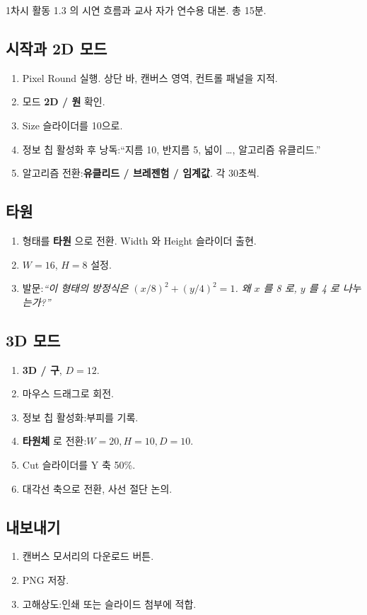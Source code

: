 \documentclass[12pt,a4paper]{scrartcl}
\newcommand{\acc}[1]{\textcolor{accent}{\textbf{#1}}}
\begin{document}
1차시 활동 1.3 의 시연 흐름과 교사 자가 연수용 대본. 총 15분.

\subsection{시작과 2D 모드}
\begin{enumerate}[leftmargin=1.5em,itemsep=0.15em,topsep=0.3em]
  \item Pixel Round 실행. 상단 바, 캔버스 영역, 컨트롤 패널을 지적.
  \item 모드 \acc{2D / 원} 확인.
  \item Size 슬라이더를 10으로.
  \item 정보 칩 활성화 후 낭독:``지름 10, 반지름 5, 넓이 …, 알고리즘 유클리드.''
  \item 알고리즘 전환:\acc{유클리드 / 브레젠험 / 임계값}. 각 30초씩.
\end{enumerate}

\subsection{타원}
\begin{enumerate}[leftmargin=1.5em,itemsep=0.15em,topsep=0.3em]
  \item 형태를 \acc{타원} 으로 전환. Width 와 Height 슬라이더 출현.
  \item $W = 16$, $H = 8$ 설정.
  \item 발문:\emph{``이 형태의 방정식은 $(x/8)^2 + (y/4)^2 = 1$. 왜 $x$ 를 8 로, $y$ 를 4 로 나누는가?''}
\end{enumerate}

\subsection{3D 모드}
\begin{enumerate}[leftmargin=1.5em,itemsep=0.15em,topsep=0.3em]
  \item \acc{3D / 구}, $D = 12$.
  \item 마우스 드래그로 회전.
  \item 정보 칩 활성화:부피를 기록.
  \item \acc{타원체} 로 전환:$W = 20, H = 10, D = 10$.
  \item Cut 슬라이더를 Y 축 50\%.
  \item 대각선 축으로 전환, 사선 절단 논의.
\end{enumerate}

\subsection{내보내기}
\begin{enumerate}[leftmargin=1.5em,itemsep=0.15em,topsep=0.3em]
  \item 캔버스 모서리의 다운로드 버튼.
  \item PNG 저장.
  \item 고해상도:인쇄 또는 슬라이드 첨부에 적합.
\end{enumerate}
\end{document}
